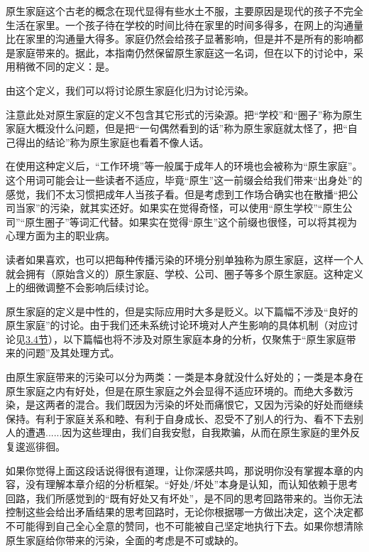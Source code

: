 
原生家庭这个古老的概念在现代显得有些水土不服，主要原因是现代的孩子不完全生活在家里。一个孩子待在学校的时间比待在家里的时间多得多，在网上的沟通量比在家里的沟通量大得多。家庭仍然会给孩子显著影响，但是并不是所有的影响都是家庭带来的。据此，本指南仍然保留原生家庭这一名词，但在以下的讨论中，采用稍微不同的定义：是。
\begin{explain}
由这个定义，我们可以将讨论原生家庭化归为讨论污染。

注意此处对原生家庭的定义不包含其它形式的污染源。把“学校”和“圈子”称为原生家庭大概没什么问题，但是把“一句偶然看到的话”称为原生家庭就太怪了，把“自己得出的结论”称为原生家庭也看着不像人话。

在使用这种定义后，“工作环境”等一般属于成年人的环境也会被称为“原生家庭”。这个用词可能会让一些读者不适应，毕竟“原生”这一前缀会给我们带来“出身处”的感觉，我们不太习惯把成年人当孩子看。但是考虑到工作场合确实也在散播“把公司当家”的污染，就其实还好。如果实在觉得奇怪，可以使用“原生学校”“原生公司”“原生圈子”等词汇代替。如果实在觉得“原生”这个前缀也很怪，可以将其视为心理方面为主的职业病。

读者如果喜欢，也可以把每种传播污染的环境分别单独称为原生家庭，这样一个人就会拥有（原始含义的）原生家庭、学校、公司、圈子等多个原生家庭。这种定义上的细微调整不会影响后续讨论。
\end{explain}
原生家庭的定义是中性的，但是实际应用时大多是贬义。以下篇幅不涉及“良好的原生家庭”的讨论。由于我们还未系统讨论环境对人产生影响的具体机制（对应讨论见\hyperref[sec:人的意识演化基本模型]{3.4节}），以下篇幅也将不涉及对原生家庭本身的分析，仅聚焦于“原生家庭带来的问题”及其处理方式。
\begin{examples}
由原生家庭带来的污染可以分为两类：一类是本身就没什么好处的；一类是本身在原生家庭之内有好处，但是在原生家庭之外会显得不适应环境的。而绝大多数污染，是这两者的混合。我们既因为污染的坏处而痛恨它，又因为污染的好处而继续保持。有利于家庭关系和睦、有利于自身成长、忍受不了别人的行为、看不下去别人的遭遇......因为这些理由，我们自我安慰，自我欺骗，从而在原生家庭的里外反复逡巡徘徊。
\end{examples}
如果你觉得上面这段话说得很有道理，让你深感共鸣，那说明你没有掌握本章的内容，没有理解本章介绍的分析框架。“好处/坏处”本身是认知，而认知依赖于思考回路，我们所感觉到的“既有好处又有坏处”，是不同的思考回路带来的。当你无法控制这些会给出矛盾结果的思考回路时，无论你根据哪一方做出决定，这个决定都不可能得到自己全心全意的赞同，也不可能被自己坚定地执行下去。如果你想清除原生家庭给你带来的污染，全面的考虑是不可或缺的。
